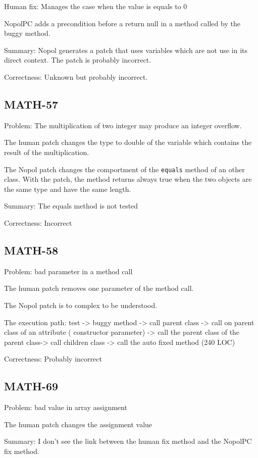 \documentclass{article}
\newcommand{\mycode}[1]{{\small \texttt{#1}}\xspace}
\begin{document}
Human fix: Manages the case when the value is equals to 0

NopolPC adds a precondition before a return null in a method called by the buggy method. 

Summary: Nopol generates a patch that uses variables which are not use in its direct context. The patch is probably incorrect.

Correctness: Unknown but probably incorrect.

\subsection{MATH-57} 

Problem: The multiplication of two integer may produce an integer overflow.

The human patch changes the type to double of the variable which contains the result of the multiplication.

The Nopol patch changes the comportment of the \mycode{equals} method of an other class. With the patch, the method returns always true when the two objects are the same type and have the same length.

Summary: The equals method is not tested

Correctness: Incorrect

\subsection{MATH-58}
Problem: bad parameter in a method call

The human patch removes one parameter of the method call.

The Nopol patch is to complex to be understood. 

The execution path:
test -> buggy method -> call parent class -> call on parent class of an attribute ( constructor parameter) -> call the parent class of the parent class-> call children class -> call the auto fixed method (240 LOC)

Correctness: Probably incorrect

\subsection{MATH-69}
Problem: bad value in array assignment

The human patch changes the assignment value

Summary: I don't see the link between the human fix method and the NopolPC fix method.
\end{document}
